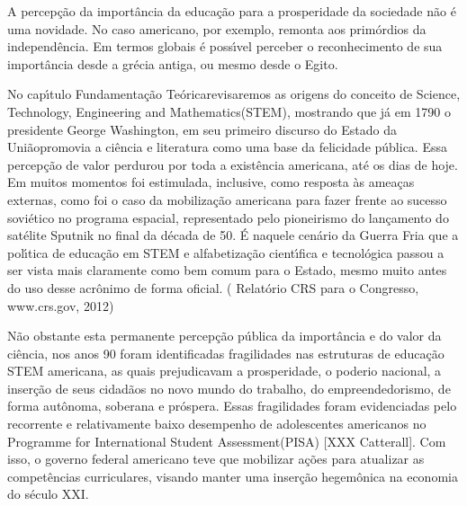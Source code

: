 \documentclass[
12pt,		%
openright,	%
twoside,  %
a4paper,			%
chapter=TITLE,		%
english,			%
french,				%
spanish,			%
brazil				%
]{USPSC-classe/USPSC_RedarTex}
\begin{document}
A percep\c{c}\~ao da import\^ancia da educa\c{c}\~ao para a prosperidade da sociedade n\~ao \'e uma novidade. No caso americano, por exemplo, remonta aos prim\'ordios da independ\^encia. Em termos globais \'e poss\'{\i}vel perceber o reconhecimento de sua import\^ancia desde a gr\'ecia antiga, ou mesmo desde o Egito.










No cap\'{\i}tulo \textquotedbl Fundamenta\c{c}\~ao Te\'orica\textquotedbl  revisaremos as origens do conceito de \textquotedbl Science, Technology, Engineering and Mathematics\textquotedbl  (STEM), mostrando que j\'a em 1790 o presidente George Washington, em seu primeiro discurso do \textquotedbl Estado da Uni\~ao\textquotedbl  promovia a ci\^encia e literatura como uma base da \textquotedbl felicidade p\'ublica\textquotedbl  [XXX]. Essa percep\c{c}\~ao de valor perdurou por toda a exist\^encia americana, at\'e os dias de hoje. Em muitos momentos foi estimulada, inclusive, como resposta \`as amea\c{c}as externas, como foi o caso da mobiliza\c{c}\~ao americana para fazer frente ao sucesso sovi\'etico no programa espacial, representado pelo pioneirismo do lan\c{c}amento do sat\'elite Sputnik no final da d\'ecada de 50. \'E naquele cen\'ario da Guerra Fria que a pol\'{\i}tica de educa\c{c}\~ao em STEM e alfabetiza\c{c}\~ao cient\'{\i}fica e tecnol\'ogica passou a ser vista mais claramente como bem comum para o Estado, mesmo muito antes do uso desse acr\^onimo de forma oficial. ( Relat\'orio CRS para o Congresso, www.crs.gov, 2012)










N\~ao obstante esta permanente percep\c{c}\~ao p\'ublica da import\^ancia e do valor da ci\^encia, nos anos 90 foram identificadas fragilidades nas estruturas de educa\c{c}\~ao STEM americana, as quais prejudicavam a prosperidade, o \textquotedbl poderio nacional\textquotedbl , a inser\c{c}\~ao de seus cidad\~aos no novo mundo do trabalho, do empreendedorismo, de forma aut\^onoma, soberana  e pr\'ospera. Essas fragilidades foram evidenciadas pelo recorrente e relativamente baixo desempenho de adolescentes americanos no \textquotedbl Programme for International Student Assessment\textquotedbl  (PISA) [XXX Catterall]. Com isso, o governo federal americano teve que mobilizar a\c{c}\~oes para atualizar as compet\^encias curriculares, visando manter uma inser\c{c}\~ao hegem\^onica na economia do s\'eculo XXI.
\end{document}
